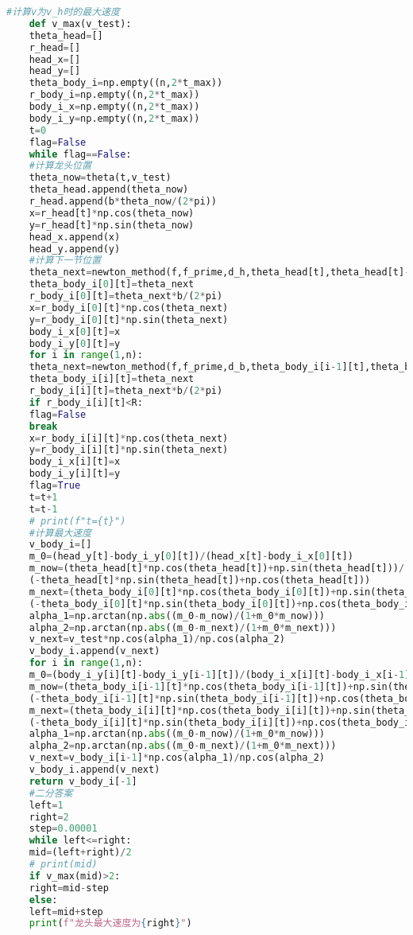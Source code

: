 \documentclass[withoutpreface,bwprint]{cumcmthesis} %
\begin{document}
\begin{lstlisting}[language=Python]
	#计算v为v_h时的最大速度
	def v_max(v_test):
	theta_head=[]
	r_head=[]
	head_x=[]
	head_y=[]
	theta_body_i=np.empty((n,2*t_max))
	r_body_i=np.empty((n,2*t_max))
	body_i_x=np.empty((n,2*t_max))
	body_i_y=np.empty((n,2*t_max))
	t=0
	flag=False
	while flag==False:
	#计算龙头位置
	theta_now=theta(t,v_test)
	theta_head.append(theta_now)
	r_head.append(b*theta_now/(2*pi))
	x=r_head[t]*np.cos(theta_now)
	y=r_head[t]*np.sin(theta_now)
	head_x.append(x)
	head_y.append(y)
	#计算下一节位置
	theta_next=newton_method(f,f_prime,d_h,theta_head[t],theta_head[t]-pi/2,v_test)
	theta_body_i[0][t]=theta_next
	r_body_i[0][t]=theta_next*b/(2*pi)
	x=r_body_i[0][t]*np.cos(theta_next)
	y=r_body_i[0][t]*np.sin(theta_next)
	body_i_x[0][t]=x
	body_i_y[0][t]=y
	for i in range(1,n):
	theta_next=newton_method(f,f_prime,d_b,theta_body_i[i-1][t],theta_body_i[i-1][t]-pi/2,v_test)
	theta_body_i[i][t]=theta_next
	r_body_i[i][t]=theta_next*b/(2*pi)
	if r_body_i[i][t]<R:
	flag=False
	break
	x=r_body_i[i][t]*np.cos(theta_next)
	y=r_body_i[i][t]*np.sin(theta_next)
	body_i_x[i][t]=x
	body_i_y[i][t]=y
	flag=True
	t=t+1
	t=t-1
	# print(f"t={t}")
	#计算最大速度
	v_body_i=[]
	m_0=(head_y[t]-body_i_y[0][t])/(head_x[t]-body_i_x[0][t])
	m_now=(theta_head[t]*np.cos(theta_head[t])+np.sin(theta_head[t]))/
	(-theta_head[t]*np.sin(theta_head[t])+np.cos(theta_head[t]))
	m_next=(theta_body_i[0][t]*np.cos(theta_body_i[0][t])+np.sin(theta_body_i[0][t]))/
	(-theta_body_i[0][t]*np.sin(theta_body_i[0][t])+np.cos(theta_body_i[0][t]))
	alpha_1=np.arctan(np.abs((m_0-m_now)/(1+m_0*m_now)))
	alpha_2=np.arctan(np.abs((m_0-m_next)/(1+m_0*m_next)))
	v_next=v_test*np.cos(alpha_1)/np.cos(alpha_2)
	v_body_i.append(v_next)
	for i in range(1,n):
	m_0=(body_i_y[i][t]-body_i_y[i-1][t])/(body_i_x[i][t]-body_i_x[i-1][t])
	m_now=(theta_body_i[i-1][t]*np.cos(theta_body_i[i-1][t])+np.sin(theta_body_i[i-1][t]))/
	(-theta_body_i[i-1][t]*np.sin(theta_body_i[i-1][t])+np.cos(theta_body_i[i-1][t]))
	m_next=(theta_body_i[i][t]*np.cos(theta_body_i[i][t])+np.sin(theta_body_i[i][t]))/
	(-theta_body_i[i][t]*np.sin(theta_body_i[i][t])+np.cos(theta_body_i[i][t]))
	alpha_1=np.arctan(np.abs((m_0-m_now)/(1+m_0*m_now)))
	alpha_2=np.arctan(np.abs((m_0-m_next)/(1+m_0*m_next)))
	v_next=v_body_i[i-1]*np.cos(alpha_1)/np.cos(alpha_2)
	v_body_i.append(v_next)
	return v_body_i[-1]
	#二分答案
	left=1
	right=2
	step=0.00001
	while left<=right:
	mid=(left+right)/2
	# print(mid)
	if v_max(mid)>2:
	right=mid-step
	else:
	left=mid+step
	print(f"龙头最大速度为{right}")
	\end{lstlisting}
\end{document}
